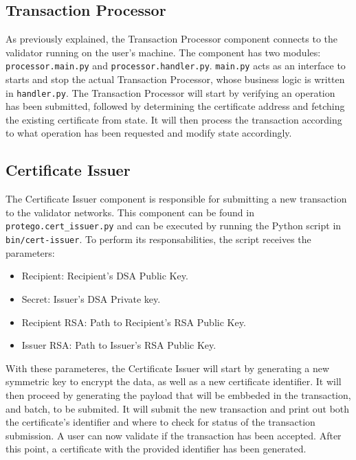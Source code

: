 \subsection{Transaction Processor}
\label{sec:implementation-tp}

As previously explained, the Transaction Processor component connects to the validator running on the user's machine. The component has two modules: \texttt{processor.main.py} and \texttt{processor.handler.py}. \texttt{main.py} acts as an interface to starts and stop the actual Transaction Processor, whose business logic is written in \texttt{handler.py}. The Transaction Processor will start by verifying an operation has been submitted, followed by determining the certificate address and fetching the existing certificate from state. It will then process the transaction according to what operation has been requested and modify state accordingly.

\subsection{Certificate Issuer}

The Certificate Issuer component is responsible for submitting a new transaction to the validator networks. This component can be found in \texttt{protego.cert\_issuer.py} and can be executed by running the Python script in \texttt{bin/cert-issuer}. To perform its responsabilities, the script receives the parameters:

\begin{itemize}
	\item Recipient: Recipient's DSA Public Key.
	\item Secret: Issuer's DSA Private key.
	\item Recipient RSA: Path to Recipient's RSA Public Key.
	\item Issuer RSA: Path to Issuer's RSA Public Key.
\end{itemize}

With these parameteres, the Certificate Issuer will start by generating a new symmetric key to encrypt the data, as well as a new certificate identifier. It will then proceed by generating the payload that will be embbeded in the transaction, and batch, to be submited. It will submit the new transaction and print out both the certificate's identifier and where to check for status of the transaction submission. A user can now validate if the transaction has been accepted. After this point, a certificate with the provided identifier has been generated.

